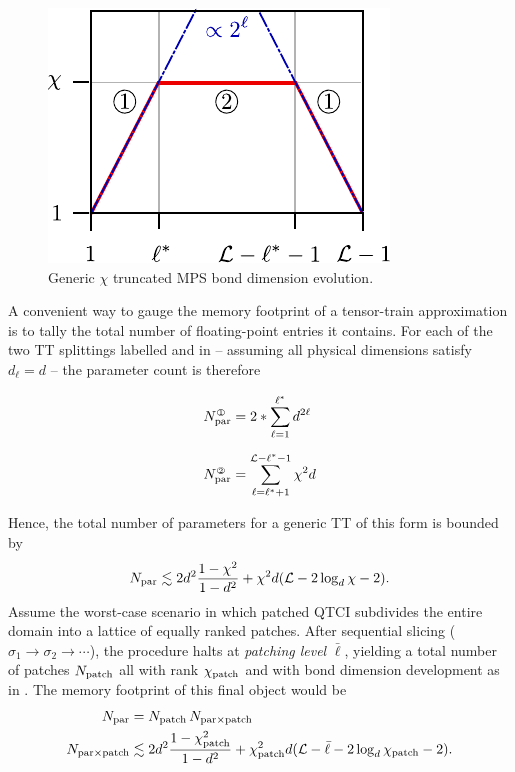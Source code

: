 \begin{figure}[ht!]
	\centering
	\includegraphics{figures/TypicalBondDims.pdf}
	\caption{Generic $\chi$ truncated MPS bond dimension evolution.}
	\label{fig:typicalBondDim}
\end{figure}

A convenient way to gauge the memory footprint of a tensor-train approximation is to tally the total number of floating-point entries it contains. For each of the two TT splittings labelled  and  in  -- assuming all physical dimensions satisfy $d_\ell = d$ -- the parameter count is therefore

\begin{equation}
	\begin{aligned}
		N^{\raisebox{.5pt}{\tiny \textcircled{\raisebox{-0.6pt} {1}}}}_{\text{par}} &= 2 *\sum\limits_{\ell = 1}^{\ell^*} d^{2\ell}  \\[6pt]
		N^{\raisebox{.5pt}{\tiny \textcircled{\raisebox{-0.6pt} {2}}}}_{\text{par}} &= \sum\limits_{\ell = \ell^* + 1}^{\mL - \ell^* - 1} \chi^2d
	\end{aligned}
\end{equation}

Hence, the total number of parameters for a generic TT of this form is bounded by
\begin{equation} 
	N_{\text{par}} \lesssim 2 d^2 \frac{1 - \chi^2 }{1 - d^2} + \chi^2d (\mathcal{L} - 2 \log_d \chi - 2). 
\end{equation}
Assume the worst-case scenario in which patched QTCI subdivides the entire domain into a lattice of equally ranked patches. After sequential slicing ($\sigma_1 \to \sigma_2 \to \cdots$), the procedure halts at \textit{patching level} ${\bar \ell}$, yielding a total number of patches $N_{\text{patch}}$ all with rank $\chi_{\text{patch}}$ and with bond dimension development as in . The memory footprint of this final object would be 
\begin{equation}
	\begin{aligned}
		N_{\text{par}} &= N_{\text{patch}}\, N_{\text{par}\times \text{patch}}\\
		N_{\text{par}\times \text{patch}} &\lesssim  2 d^2 \frac{1 - \chi_{\text{patch}}^2 }{1 - d^2} + \chi_{\text{patch}}^2d (\mathcal{L} - {\bar \ell} - 2 \log_d \chi_{\text{patch}} - 2).
	\end{aligned}
	\label{eq:patchMemoryEstimate}
\end{equation}

